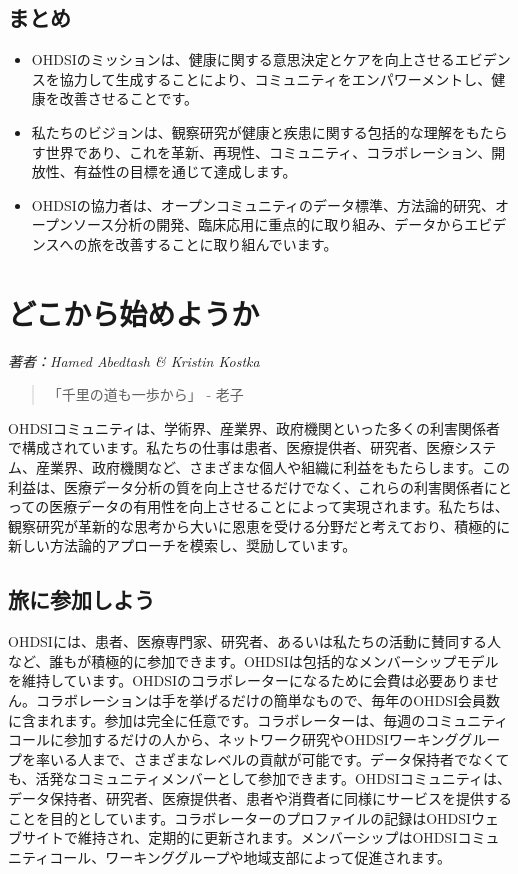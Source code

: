 \documentclass[
  11pt]{book}
\makeatletter
\newenvironment{kframe}{%
\medskip{}
\setlength{\fboxsep}{.8em}
 \def\at@end@of@kframe{}%
 \ifinner\ifhmode%
  \def\at@end@of@kframe{\end{minipage}}%
  \begin{minipage}{\columnwidth}%
 \fi\fi%
 \def\FrameCommand##1{\hskip\@totalleftmargin \hskip-\fboxsep
 \colorbox{myShadeColor}{##1}\hskip-\fboxsep
     \hskip-\linewidth \hskip-\@totalleftmargin \hskip\columnwidth}%
 \MakeFramed {\advance\hsize-\width
   \@totalleftmargin\z@ \linewidth\hsize
   \@setminipage}}%
 {\par\unskip\endMakeFramed%
 \at@end@of@kframe}
\newenvironment{rmdblock}[1]
  {
  \begin{itemize}
  \renewcommand{\labelitemi}{
    \raisebox{-.7\height}[0pt][0pt]{
      {\setkeys{Gin}{width=3em,keepaspectratio}\texttt{[image: images/\#1]}}
    }
  }
  \setlength{\fboxsep}{1em}
  \begin{kframe}
  \item
  }
  {
  \end{kframe}
  \end{itemize}
  }
\newenvironment{rmdsummary}
  {\begin{rmdblock}{summary}}
  {\end{rmdblock}}
\theoremstyle{definition}
\theoremstyle{definition}
\theoremstyle{definition}
\theoremstyle{definition}
\theoremstyle{remark}
\makeatother
\begin{document}
\section{まとめ}\label{ux307eux3068ux3081}

\begin{rmdsummary}
\begin{itemize}
\item
  OHDSIのミッションは、健康に関する意思決定とケアを向上させるエビデンスを協力して生成することにより、コミュニティをエンパワーメントし、健康を改善させることです。
\item
  私たちのビジョンは、観察研究が健康と疾患に関する包括的な理解をもたらす世界であり、これを革新、再現性、コミュニティ、コラボレーション、開放性、有益性の目標を通じて達成します。
\item
  OHDSIの協力者は、オープンコミュニティのデータ標準、方法論的研究、オープンソース分析の開発、臨床応用に重点的に取り組み、データからエビデンスへの旅を改善することに取り組んでいます。
\end{itemize}
\end{rmdsummary}

\chapter{どこから始めようか}\label{WhereToBegin}

\emph{著者：Hamed Abedtash \& Kristin Kostka}

\begin{quote}
「千里の道も一歩から」 - 老子
\end{quote}

OHDSIコミュニティは、学術界、産業界、政府機関といった多くの利害関係者で構成されています。私たちの仕事は患者、医療提供者、研究者、医療システム、産業界、政府機関など、さまざまな個人や組織に利益をもたらします。この利益は、医療データ分析の質を向上させるだけでなく、これらの利害関係者にとっての医療データの有用性を向上させることによって実現されます。私たちは、観察研究が革新的な思考から大いに恩恵を受ける分野だと考えており、積極的に新しい方法論的アプローチを模索し、奨励しています。

\section{旅に参加しよう}\label{ux65c5ux306bux53c2ux52a0ux3057ux3088ux3046}

OHDSIには、患者、医療専門家、研究者、あるいは私たちの活動に賛同する人など、誰もが積極的に参加できます。OHDSIは包括的なメンバーシップモデルを維持しています。OHDSIのコラボレーターになるために会費は必要ありません。コラボレーションは手を挙げるだけの簡単なもので、毎年のOHDSI会員数に含まれます。参加は完全に任意です。コラボレーターは、毎週のコミュニティコールに参加するだけの人から、ネットワーク研究やOHDSIワーキンググループを率いる人まで、さまざまなレベルの貢献が可能です。データ保持者でなくても、活発なコミュニティメンバーとして参加できます。OHDSIコミュニティは、データ保持者、研究者、医療提供者、患者や消費者に同様にサービスを提供することを目的としています。コラボレーターのプロファイルの記録はOHDSIウェブサイトで維持され、定期的に更新されます。メンバーシップはOHDSIコミュニティコール、ワーキンググループや地域支部によって促進されます。
\end{document}
